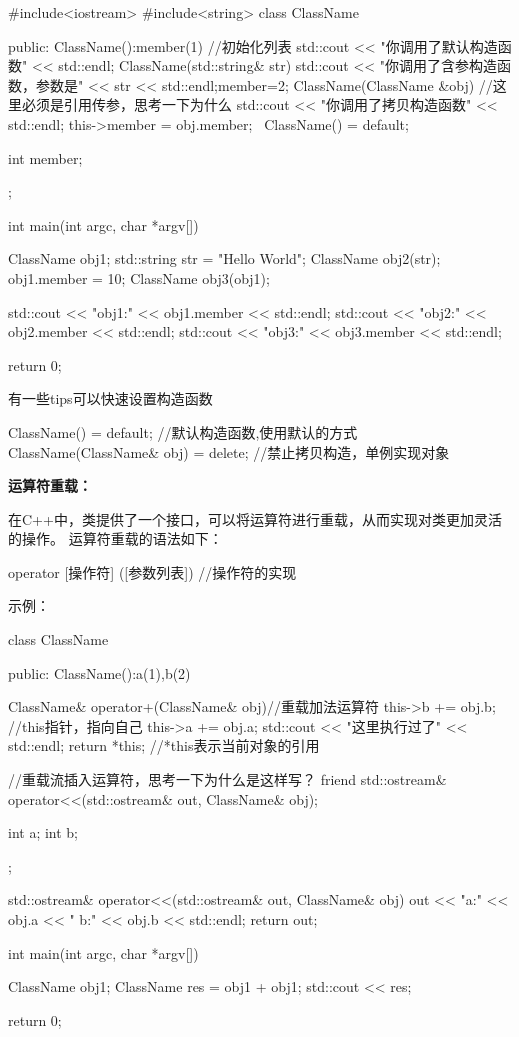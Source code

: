 \begin{tcode}
#include<iostream>
#include<string>
class ClassName {
public:
    ClassName():member(1) //初始化列表
    {std::cout << "你调用了默认构造函数" << std::endl;}
    ClassName(std::string& str) 
    {std::cout << "你调用了含参构造函数，参数是" << str << std::endl;member=2;}
    ClassName(ClassName &obj) //这里必须是引用传参，思考一下为什么
    {std::cout << "你调用了拷贝构造函数" << std::endl;
    this->member = obj.member;}
    ~ClassName() = default;

    int member;
};

int main(int argc, char *argv[]) {
    ClassName obj1;
    std::string str = "Hello World";
    ClassName obj2(str);
    obj1.member = 10;
    ClassName obj3(obj1);

    std::cout << "obj1:" << obj1.member << std::endl;
    std::cout << "obj2:" << obj2.member << std::endl;
    std::cout << "obj3:" << obj3.member << std::endl;

    return 0;
}
\end{tcode}
有一些tips可以快速设置构造函数
\begin{tcode}
ClassName() = default;              //默认构造函数,使用默认的方式
ClassName(ClassName& obj) = delete; //禁止拷贝构造，单例实现对象
\end{tcode}
\textbf{运算符重载：}

在C++中，类提供了一个接口，可以将运算符进行重载，从而实现对类更加灵活的操作。
运算符重载的语法如下：

\begin{tcode}
[返回值] operator [操作符] ([参数列表]) {
    //操作符的实现
}
\end{tcode}

示例：

\begin{tcode}
class ClassName {
    public:
        ClassName():a(1),b(2) {}
    
        ClassName& operator+(ClassName& obj){//重载加法运算符
            this->b += obj.b;   //this指针，指向自己
            this->a += obj.a;
            std::cout << "这里执行过了" << std::endl;
            return *this;   //*this表示当前对象的引用
        }
     
        //重载流插入运算符，思考一下为什么是这样写？
        friend std::ostream& operator<<(std::ostream& out, ClassName& obj);
    
        int a;
        int b;
    };
    
    std::ostream& operator<<(std::ostream& out, ClassName& obj){
        out << "a:" << obj.a << " b:" << obj.b << std::endl;
        return out;
    }
    
    int main(int argc, char *argv[]) {
        ClassName obj1;
        ClassName res = obj1 + obj1;
        std::cout << res;
    
        return 0;
    }
\end{tcode}


